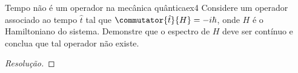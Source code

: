 \begin{exercício}{Tempo não é um operador na mecânica quântica}{ex4}
    Considere um operador associado ao tempo \(\hat{t}\) tal que \( \commutator{\hat{t}}{H} = - i \hbar\), onde \(H\) é o Hamiltoniano do sistema. Demonstre que o espectro de \(H\) deve ser contínuo e conclua que tal operador não existe.
\end{exercício}
\begin{proof}[Resolução]
    
\end{proof}
